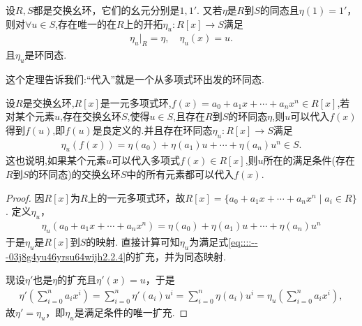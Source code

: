 \documentclass[../../main.tex]{subfiles}%
\begin{document}
\begin{theorem}\label{theorem:抽象代数--定理2.2.2}
设$R,S$都是交换幺环，它们的幺元分别是$1,1'$. 又若$\eta$是$R$到$S$的同态且$\eta(1)=1'$，则对$\forall u\in S$,存在唯一的在$R$上的开拓$\eta_u:R[x]\to S$满足
\begin{align}\label{eq::::---03j8g4yu46yrsu64wijh2.2.4}
\eta _u|_R=\eta ,\quad \eta _u(x)=u.
\end{align}
且$\eta_u$是环同态.
\end{theorem}
\begin{remark}
这个定理告诉我们:“代入”就是一个从多项式环出发的环同态.

设$R$是交换幺环,$R[x]$是一元多项式环,$f(x) =a_0+a_1x+\cdots +a_nx^n\in R[x]$,若对某个元素$u$,存在交换幺环$S$,使得$u\in S$,且存在$R$到$S$的环同态$\eta$,则$u$可以代入$f(x)$得到$f(u)$,即$f(u)$是良定义的.并且存在环同态$\eta_u:R[x] \rightarrow S$满足
\begin{align*}
\eta_u(f(x)) =\eta(a_0) +\eta(a_1)u+\cdots +\eta(a_n)u^n\in S.
\end{align*}
这也说明,如果某个元素$u$可以代入多项式$f(x) \in R[x]$,则$u$所在的满足条件(存在$R$到$S$的环同态)的交换幺环$S$中的所有元素都可以代入$f(x)$.
\end{remark}
\begin{proof}

因$R[x]$为$R$上的一元多项式环，故$R[x]=\{a_0+a_1x+\cdots+a_nx^n\mid a_i\in R\}$. 定义$\eta_u$，
\begin{align}
\eta_u(a_0+a_1x+\cdots+a_nx^n)=\eta(a_0)+\eta(a_1)u+\cdots+\eta(a_n)u^n\label{eq::::---03j8g4yu46yrsu64wijh2.2.5}
\end{align}
于是$\eta_u$是$R[x]$到$S$的映射. 直接计算可知$\eta_u$为满足式\eqref{eq::::---03j8g4yu46yrsu64wijh2.2.4}的扩充，并为同态映射.

现设$\eta'$也是$\eta$的扩充且$\eta'(x)=u$，于是
\begin{align*}
\eta' \left( \sum_{i=0}^n{a_ix^i} \right) =\sum_{i=0}^n{\eta' (a_i)u^i}=\sum_{i=0}^n{\eta (a_i)u^i}=\eta _u\left( \sum_{i=0}^n{a_ix^i} \right) ,
\end{align*}
故$\eta'=\eta_u$，即$\eta_u$是满足条件的唯一扩充.

\end{proof}
\end{document}
